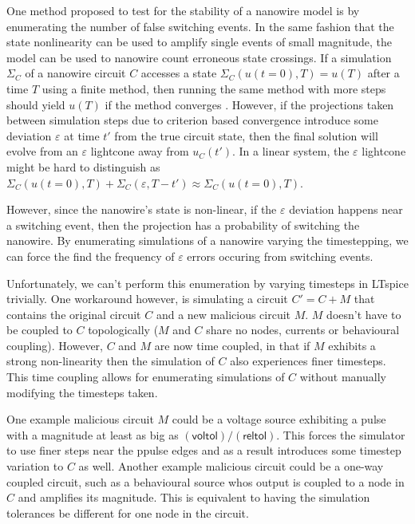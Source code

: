 \documentclass[]{article}
\newcommand{\todoidea}[2][]{}
\newcommand{\cf}[1]{\textsf{#1}}
\begin{document}
One method proposed to test for the stability of a nanowire model is by enumerating
the number of false switching events. In the same fashion that the state nonlinearity
can be used to amplify single events of small magnitude, the model can be used to 
nanowire count erroneous state crossings. If a simulation $\Sigma_C$
of a nanowire circuit $C$ accesses a state $\Sigma_C( u(t=0), T ) = u(T)$ after
a time $T$ using a finite method,
then running the same method with more steps should yield $u(T)$ if the method
converges \cite{DAHLQUIST}.
However, if the projections taken between simulation steps due to criterion 
based convergence introduce some deviation $\varepsilon$ at time $t'$ from the 
true circuit state, then the final solution will evolve from an $\varepsilon$ lightcone
away from $u_C(t')$. In a linear system, the $\varepsilon$ lightcone might be hard to
distinguish as $\Sigma_C(u(t=0), T) + \Sigma_C(\varepsilon, T-t') \approx \Sigma_C(u(t=0), T)$. 

However, since the nanowire's state is non-linear, if the $\varepsilon$ deviation happens
near a switching event, then the projection has a probability of switching the 
nanowire. By enumerating simulations of a nanowire varying the timestepping,
we can force the find the frequency of $\varepsilon$ errors occuring from switching
events.

Unfortunately, we can't perform this enumeration by varying timesteps in LTspice 
trivially. One workaround however, is simulating a circuit $C'=C+M$ that contains
the original circuit $C$ and a new malicious circuit $M$. $M$ doesn't have to be coupled
to $C$ topologically ($M$ and $C$ share no nodes, currents or behavioural coupling).
However, $C$ and $M$ are now time coupled, in that if $M$ exhibits a strong non-linearity
then the simulation of $C$ also experiences finer timesteps. This time coupling allows
for enumerating simulations of $C$ without manually modifying the timesteps taken.

One example malicious circuit $M$ could be a voltage source exhibiting a pulse 
with a magnitude at least as big as $(\cf{voltol})/(\cf{reltol})$\todoidea[]{verify this ratio constraint?}.
This forces the simulator to use finer steps near the ppulse edges and as a result
introduces some timestep variation to $C$ as well. Another example malicious circuit 
could be a one-way coupled circuit, such as a behavioural source whos output is coupled
to a node in $C$ and amplifies its magnitude. This is equivalent to having the simulation
tolerances be different for one node in the circuit.
\end{document}
